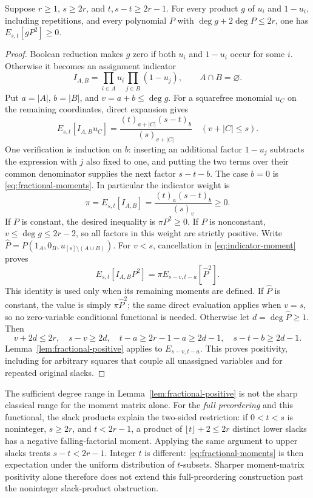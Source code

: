 \begin{lemma}
\label{lem:assignment-localizer}
Suppose $r\ge1$, $s\ge2r$, and $t,s-t\ge2r-1$.
For every product $g$ of $u_i$ and $1-u_i$, including repetitions, and
every polynomial $P$ with
$\deg g+2\deg P\le2r$, one has $E_{s,t}[gP^2]\ge0$.
\end{lemma}
\begin{proof}
Boolean reduction makes $g$ zero if both $u_i$ and $1-u_i$ occur for
some $i$. Otherwise it becomes an assignment indicator
\[
 I_{A,B}=\prod_{i\in A}u_i\prod_{j\in B}(1-u_j),\qquad A\cap B=\varnothing.
\]
Put $a=|A|$, $b=|B|$, and $v=a+b\le\deg g$. For a squarefree monomial
$u_C$ on the remaining coordinates, direct expansion gives
\begin{equation}\label{eq:indicator-moment}
 E_{s,t}[I_{A,B}u_C]
 =\frac{(t)_{a+|C|}(s-t)_b}{(s)_{v+|C|}}
 \quad(v+|C|\le s).
\end{equation}
One verification is induction on $b$: inserting an additional factor
$1-u_j$ subtracts the expression with $j$ also fixed to one, and putting
the two terms over their common denominator supplies the next factor
$s-t-b$. The case $b=0$ is \eqref{eq:fractional-moments}.
In particular the indicator weight is
\[
 \pi=E_{s,t}[I_{A,B}]=\frac{(t)_a(s-t)_b}{(s)_v}\ge0.
\]
If $P$ is constant, the desired inequality is $\pi P^2\ge0$.
If $P$ is nonconstant, $v\le\deg g\le2r-2$, so all factors in this
weight are strictly positive. Write
$\widehat P=P(1_A,0_B,u_{[s]\setminus(A\cup B)})$.
For $v<s$, cancellation in \eqref{eq:indicator-moment} proves
\begin{equation}\label{eq:conditional-moments}
 E_{s,t}[I_{A,B}P^2]=\pi E_{s-v,t-a}[\widehat P^2].
\end{equation}
This identity is used only when its remaining moments are defined.
If $\widehat P$ is constant, the value is simply $\pi\widehat P^2$;
the same direct evaluation applies when $v=s$, so no zero-variable
conditional functional is needed.
Otherwise let $d=\deg\widehat P\ge1$. Then
\[
 v+2d\le2r,\quad s-v\ge2d,\quad
 t-a\ge2r-1-a\ge2d-1,\quad s-t-b\ge2d-1.
\]
Lemma~\ref{lem:fractional-positive} applies to
$E_{s-v,t-a}$. This proves positivity, including for arbitrary squares
that couple all unassigned variables and for repeated original slacks.
\end{proof}

The sufficient degree range in Lemma~\ref{lem:fractional-positive} is
not the sharp classical range for the moment matrix alone. For the
\emph{full preordering} and this functional, the slack products explain
the two-sided restriction: if $0<t<s$ is noninteger,
$s\ge2r$, and $t<2r-1$, a product of $\lfloor t\rfloor+2\le2r$
distinct lower slacks has a negative falling-factorial moment. Applying
the same argument to upper slacks treats $s-t<2r-1$. Integer $t$ is
different: \eqref{eq:fractional-moments} is then expectation under the
uniform distribution of $t$-subsets. Sharper moment-matrix positivity
alone therefore does not extend this full-preordering construction past
the noninteger slack-product obstruction.

